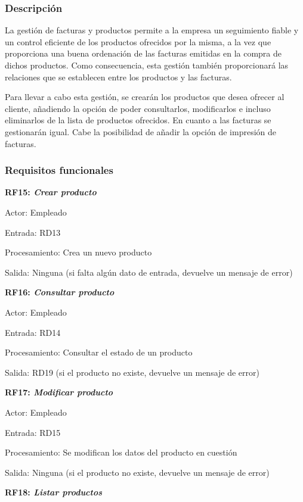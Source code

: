 \documentclass[paper=a4, fontsize=11pt, spanish]{scrartcl}
\begin{document}
\subsubsection{Descripción}
\setlength{\parindent}{3em} La gestión de facturas y productos permite a la empresa un seguimiento fiable y un control eficiente de los productos ofrecidos por la misma, a la vez que proporciona una buena ordenación de las facturas emitidas en la compra de dichos productos. Como consecuencia, esta gestión también proporcionará las relaciones que se establecen entre los productos y las facturas.

	Para llevar a cabo esta gestión, se crearán los productos que desea ofrecer al cliente, añadiendo la opción de poder consultarlos, modificarlos e incluso eliminarlos de la lista de productos ofrecidos. En cuanto a las facturas se gestionarán igual. Cabe la posibilidad de añadir la opción de impresión de facturas.

\subsubsection{Requisitos funcionales}
\setlength{\parindent}{0em}
	\textbf{RF15: \textit{Crear producto}}
	\setlength{\parindent}{2em}

	Actor: Empleado

	Entrada: RD13

	Procesamiento: Crea un nuevo producto

	Salida: Ninguna (si falta algún dato de entrada, devuelve un mensaje de error)

	\setlength{\parindent}{0em}
	\textbf{RF16: \textit{Consultar producto}}
	\setlength{\parindent}{2em}

	Actor: Empleado

	Entrada: RD14

	Procesamiento: Consultar el estado de un producto

	Salida: RD19 (si el producto no existe, devuelve un mensaje de error)

	\setlength{\parindent}{0em}
	\textbf{RF17: \textit{Modificar producto}}
	\setlength{\parindent}{2em}

	Actor: Empleado

	Entrada: RD15

	Procesamiento: Se modifican los datos del producto en cuestión

	Salida: Ninguna (si el producto no existe, devuelve un mensaje de error)

	\setlength{\parindent}{0em}
	\textbf{RF18: \textit{Listar productos}}
	\setlength{\parindent}{2em}
\end{document}
